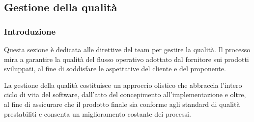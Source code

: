 \subsection{Gestione della qualità}
\subsubsection{Introduzione}
Questa sezione è dedicata alle direttive del team per gestire la qualità. Il processo mira a garantire la qualità del flusso operativo adottato dal fornitore sui prodotti sviluppati, al fine di soddisfare le aspettative del cliente e del proponente.

La gestione della qualità costituisce un approccio olistico che abbraccia l'intero ciclo di vita del software, dall'atto del concepimento all'implementazione e oltre, al fine di assicurare che il prodotto finale sia conforme agli standard di qualità prestabiliti e consenta un miglioramento costante dei processi.

